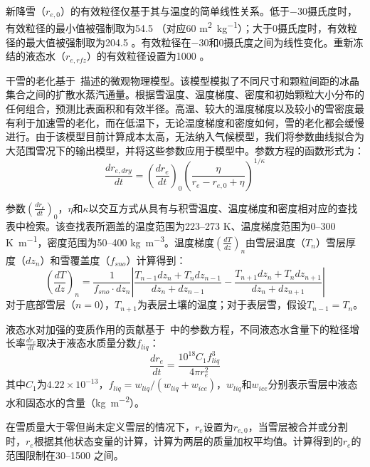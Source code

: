 新降雪（$r_{e,0}$）的有效粒径仅基于其与温度的简单线性关系。低于$-30$摄氏度时，有效粒径的最小值被强制取为54.5 \unit{}（对应60 \unit{m^{2}.kg^{-1}}）；大于0摄氏度时，有效粒径的最大值被强制取为204.5 \unit{}。有效粒径在$-30$和0摄氏度之间为线性变化。重新冻结的液态水（$r_{e,rfz}$）的有效粒径设置为1000 \unit{}。

干雪的老化基于~\citet{flanner2006LinkingSnowpackMicrophysics}描述的微观物理模型。该模型模拟了不同尺寸和颗粒间距的冰晶集合之间的扩散水蒸汽通量。根据雪温度、温度梯度、密度和初始颗粒大小分布的任何组合，预测比表面积和有效半径。高温、较大的温度梯度以及较小的雪密度最有利于加速雪的老化，而在低温下，无论温度梯度和密度如何，雪的老化都会缓慢进行。由于该模型目前计算成本太高，无法纳入气候模型，我们将参数曲线拟合为大范围雪况下的输出模型，并将这些参数应用于模型中。参数方程的函数形式为：
\begin{equation}
\frac{{dr}_{e,dry}}{dt} = \left( \frac{{dr}_{e}}{dt} \right)_{0}\left( \frac{\eta}{r_{e} - r_{e,0} + \eta} \right)^{1/\kappa}
\end{equation}

参数$\left( \frac{{dr}_{e}}{dt} \right)_{0}$，$\eta$和$\kappa$以交互方式从具有与积雪温度、温度梯度和密度相对应的查找表中检索。该查找表所涵盖的温度范围为223--273 K、温度梯度范围为0--300 \unit{K.m^{-1}}，密度范围为50--400 \unit{kg.m^{-3}}。温度梯度$\left( \frac{dT}{dz} \right)_{n}$由雪层温度（$T_n$）雪层厚度（$dz_n$）和雪覆盖度（$f_{sno}$）计算得到：
%
\begin{equation}
\left( \frac{dT}{dz} \right)_{n} = \frac{1}{f_{sno}\cdot {dz}_{n}}\left| \frac{T_{n - 1}{dz}_{n} + T_{n}{dz}_{n - 1}}{{dz}_{n} + {dz}_{n - 1}} - \frac{T_{n + 1}{dz}_{n} + T_{n}{dz}_{n + 1}}{{dz}_{n} + {dz}_{n + 1}} \right|
\end{equation}
%
对于底部雪层（$n=0$），$T_{n+1}$为表层土壤的温度；对于表层雪，假设$T_{n-1}=T_n$。

液态水对加强的变质作用的贡献基于~\citet{brun1989InvestigationWetSnowMetamorphism}中的参数方程，不同液态水含量下的粒径增长率$\frac{{dr}_{e}}{dt}$取决于液态水质量分数$f_{liq}$：
%
\begin{equation}
\frac{{dr}_{e}}{dt} = \frac{10^{18}C_{1}f_{liq}^{3}}{4\pi r_{e}^{2}}
\end{equation}
%
其中$C_{1}$为$4.22×10^{-13}$，$f_{liq}=w_{liq}/(w_{liq}+w_{ice})$，$w_{liq}$和$w_{ice}$分别表示雪层中液态水和固态水的含量（\unit {kg.m^{-2}}）。 

在雪质量大于零但尚未定义雪层的情况下，$r_e$设置为$r_{e,0}$，当雪层被合并或分割时，$r_e$根据其他状态变量的计算，计算为两层的质量加权平均值。计算得到的$r_e$的范围限制在30--1500 \unit{}之间。

